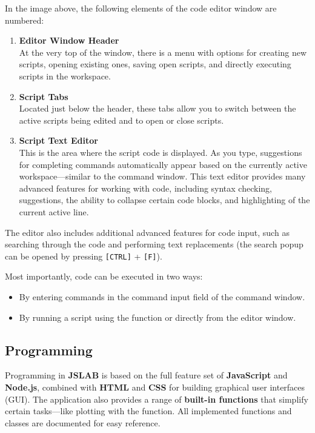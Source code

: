 \documentclass[12pt,a4paper]{article}
\begin{document}
In the image above, the following elements of the code editor window are numbered:
\begin{enumerate}
  \item \textbf{Editor Window Header}\\
        At the very top of the window, there is a menu with options for creating new scripts, opening existing ones, saving open scripts, and directly executing scripts in the workspace.
  \item \textbf{Script Tabs}\\
        Located just below the header, these tabs allow you to switch between the active scripts being edited and to open or close scripts.
  \item \textbf{Script Text Editor}\\
        This is the area where the script code is displayed. As you type, suggestions for completing commands automatically appear based on the currently active workspace---similar to the command window. This text editor provides many advanced features for working with code, including syntax checking, suggestions, the ability to collapse certain code blocks, and highlighting of the current active line.
\end{enumerate}

The editor also includes additional advanced features for code input, such as searching through the code and performing text replacements (the search popup can be opened by pressing \texttt{[CTRL]} + \texttt{[F]}).

Most importantly, code can be executed in two ways:
\begin{itemize}
  \item By entering commands in the command input field of the command window.
  \item By running a script using the  function or directly from the editor window.
\end{itemize}


\subsection{Programming}
\label{sec:programming}

Programming in \textbf{JSLAB} is based on the full feature set of \textbf{JavaScript} and \textbf{Node.js}, combined with \textbf{HTML} and \textbf{CSS} for building graphical user interfaces (GUI). The application also provides a range of \textbf{built-in functions} that simplify certain tasks---like plotting with the  function. All implemented functions and classes are documented for easy reference.
\end{document}
